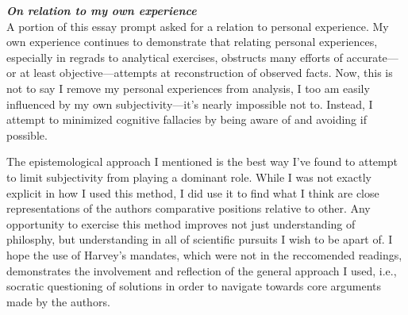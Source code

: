 \documentclass[12pt,a4paper]{article}
\begin{document}
\textit{\textbf{On relation to my own experience}}\\
A portion of this essay prompt asked for a relation to personal experience. My own experience continues to demonstrate that relating personal experiences, especially in regrads to analytical exercises, obstructs many efforts of accurate---or at least objective---attempts at reconstruction of observed facts. Now, this is not to say I remove my personal experiences from analysis, I too am easily influenced by my own subjectivity---it's nearly impossible not to. Instead, I attempt to minimized cognitive fallacies by being aware of and avoiding if possible.

The epistemological approach I mentioned is the best way I've found to attempt to limit subjectivity from playing a dominant role. While I was not exactly explicit in how I used this method, I did use it to find what I think are close representations of the authors comparative positions relative to other. Any opportunity to exercise this method improves not just understanding of philosphy, but understanding in all of scientific pursuits I wish to be apart of. I hope the use of Harvey's mandates, which were not in the reccomended readings, demonstrates the involvement and reflection of the general approach I used, i.e., socratic questioning of solutions in order to navigate towards core arguments made by the authors. 






\clearpage


\end{document}
